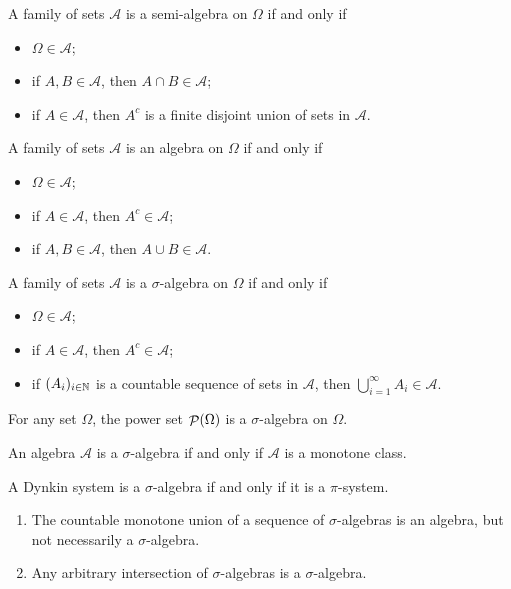 \begin{lemma} \label{lemma:setAlgebraCriteria}
A family of sets $\mathcal{A}$ is a semi-algebra on $\Omega$ \textup{if and only if}
\begin{itemize}
\item $\Omega\in\mathcal{A}$;
\item if $A,B\in \mathcal{A}$, then $A\cap B\in \mathcal{A}$;
\item if $A\in \mathcal{A}$, then $A^c$ is a finite disjoint union of sets in $\mathcal{A}$.
\end{itemize}
A family of sets $\mathcal{A}$ is an algebra on $\Omega$ \textup{if and only if}
\begin{itemize}
\item $\Omega\in\mathcal{A}$;
\item if $A\in \mathcal{A}$, then $A^c\in \mathcal{A}$;
\item if $A,B\in \mathcal{A}$, then $A\cup B\in \mathcal{A}$.
\end{itemize}
A family of sets $\mathcal{A}$ is a $\sigma$-algebra on $\Omega$ \textup{if and only if}
\begin{itemize}
\item $\Omega\in\mathcal{A}$;
\item if $A\in \mathcal{A}$, then $A^c\in \mathcal{A}$;
\item if $(A_i)_{i\in\mathbb{N}}$ is a countable sequence of sets in $\mathcal{A}$, then $\bigcup_{i=1}^\infty A_i\in \mathcal{A}$.
\end{itemize}
\end{lemma}

\begin{example}
For any set $\Omega$, the power set $\mathop{\mathcal{P}}(\Omega)$ is a $\sigma$-algebra on $\Omega$.
\end{example}

\begin{lemma} \label{lemma:algebraMonotoneClass}
An algebra $\mathcal{A}$ is a $\sigma$-algebra \textup{if and only if} $\mathcal{A}$ is a monotone class.
\end{lemma}
\begin{lemma} \label{lemma:DynkinPiSystem}
A Dynkin system is a $\sigma$-algebra \textup{if and only if} it is a $\pi$-system.
\end{lemma}


\begin{lemma}
\begin{enumerate}
\item The countable monotone union of a sequence of $\sigma$-algebras is an algebra, but not necessarily a $\sigma$-algebra.
\item Any arbitrary intersection of $\sigma$-algebras is a $\sigma$-algebra.
\end{enumerate}
\end{lemma}

